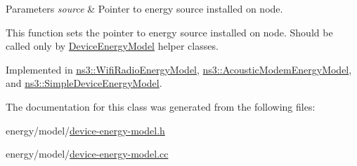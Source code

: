 \begin{DoxyParams}{Parameters}
{\em source} & Pointer to energy source installed on node.\\
\hline
\end{DoxyParams}
This function sets the pointer to energy source installed on node. Should be called only by \hyperlink{classns3_1_1DeviceEnergyModel}{Device\+Energy\+Model} helper classes. 

Implemented in \hyperlink{classns3_1_1WifiRadioEnergyModel_a6ac586c77ee4ac849e6b09bd4caf0cf4}{ns3\+::\+Wifi\+Radio\+Energy\+Model}, \hyperlink{classns3_1_1AcousticModemEnergyModel_ae8528d992ff06b11da750d064e0c9ce3}{ns3\+::\+Acoustic\+Modem\+Energy\+Model}, and \hyperlink{classns3_1_1SimpleDeviceEnergyModel_adccfb18951ab328e076662a2cedd2340}{ns3\+::\+Simple\+Device\+Energy\+Model}.



The documentation for this class was generated from the following files\+:\begin{DoxyCompactItemize}
\item 
energy/model/\hyperlink{device-energy-model_8h}{device-\/energy-\/model.\+h}\item 
energy/model/\hyperlink{device-energy-model_8cc}{device-\/energy-\/model.\+cc}\end{DoxyCompactItemize}
